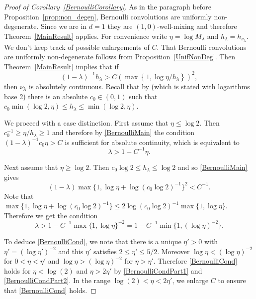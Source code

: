 \documentclass[10pt, english,oneside,reqno]{amsart}
\theoremstyle{plain}
\theoremstyle{remark}
\numberwithin{equation}{section}
\numberwithin{figure}{section}
\begin{document}
\begin{proof}[Proof of Corollary~\ref{BernoulliCorollary}]
        As in the paragraph before Proposition~\ref{prop:non_degen}, Bernoulli convolutions are uniformly non-degenerate. Since we are in $d = 1$ they are $(1,0)$-well-mixing and therefore Theorem~\ref{MainResult} applies. For convenience write $\eta = \log M_{\lambda}$ and $h_{\lambda} = h_{\nu_{\lambda}}$. We don't keep track of possible enlargements of $C$. That Bernoulli convolutions are uniformly non-degenerate follows from Proposition~\ref{UnifNonDeg}. Then Theorem~\ref{MainResult} implies that if 
        \begin{equation}\label{BernoulliMain}
            (1-\lambda)^{-1}h_{\lambda} > C \left(\max\left\{ 1, \log \eta/h_{\lambda} \right\} \right)^2,
        \end{equation}
        then $\nu_{\lambda}$ is absolutely continuous. Recall that by \cite[Theorem 5]{BreuillardVarju2020} (which is stated with logarithms base 2) there is an absolute $c_0 \in (0,1)$ such that $c_0 \min(\log 2,\eta) \leq h_{\lambda} \leq \min(\log 2,\eta).$ 
        
        We proceed with a case distinction. First assume that $\eta \leq \log 2$. Then $c_0^{-1} \geq \eta/h_{\lambda} \geq 1$ and therefore by \eqref{BernoulliMain} the condition $(1-\lambda)^{-1}c_0 \eta > C$ is sufficient for absolute continuity, which is equivalent to 
        \begin{equation}\label{BernoulliCondPart1}
            \lambda > 1 - C^{-1}\eta.
        \end{equation}
        
        Next assume that $\eta \geq \log 2$. Then $c_0\log 2 \leq h_{\lambda} \leq \log 2$ and so \eqref{BernoulliMain} gives $$(1-\lambda) \max\{ 1, \log \eta + \log (c_0\log 2)^{-1} \}^2 < C^{-1}.$$ Note that $\max\{ 1, \log \eta + \log (c_0\log 2)^{-1} \} \leq 2\log (c_0\log 2)^{-1}\max\{ 1, \log \eta \}$. Therefore we get the condition 
        \begin{equation}\label{BernoulliCondPart2}
            \lambda > 1 - C^{-1}\max\{ 1, \log \eta \}^{-2} = 1 - C^{-1}\min\{ 1, (\log \eta)^{-2} \}.
        \end{equation}

        To deduce \eqref{BernoulliCond}, we note that there is a unique $\eta' > 0$ with $\eta' = (\log \eta')^{-2}$ and this $\eta'$ satisfies $2 \leq \eta' \leq 5/2$. Moreover $\log \eta < (\log \eta)^{-2}$ for $0 < \eta < \eta'$ and $\log \eta > (\log \eta)^{-2}$ for $\eta > \eta'$. Therefore \eqref{BernoulliCond} holds for $\eta < \log(2)$ and $\eta > 2\eta'$ by \eqref{BernoulliCondPart1} and \eqref{BernoulliCondPart2}. In the range $\log(2) < \eta < 2\eta'$, we enlarge $C$ to ensure that \eqref{BernoulliCond} holds. 
    \end{proof}
\end{document}
